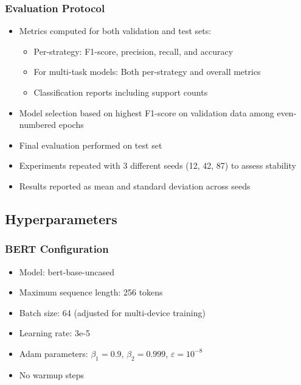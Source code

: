 \documentclass[10pt,twocolumn]{article}
\begin{document}
\subsubsection{Evaluation Protocol}
\begin{itemize}
    \item Metrics computed for both validation and test sets: \begin{itemize}
        \item Per-strategy: F1-score, precision, recall, and accuracy
        \item For multi-task models: Both per-strategy and overall metrics
        \item Classification reports including support counts
    \end{itemize}
    \item Model selection based on highest F1-score on validation data among even-numbered epochs
    \item Final evaluation performed on test set
    \item Experiments repeated with 3 different seeds (12, 42, 87) to assess stability
    \item Results reported as mean and standard deviation across seeds
\end{itemize}

\subsection{Hyperparameters}

\subsubsection{BERT Configuration}
\begin{itemize}
    \item Model: bert-base-uncased
    \item Maximum sequence length: 256 tokens
    \item Batch size: 64 (adjusted for multi-device training)
    \item Learning rate: 3e-5
    \item Adam parameters: $\beta_1 = 0.9$, $\beta_2 = 0.999$, $\varepsilon = 10^{-8}$
    \item No warmup steps
\end{itemize}
\end{document}
